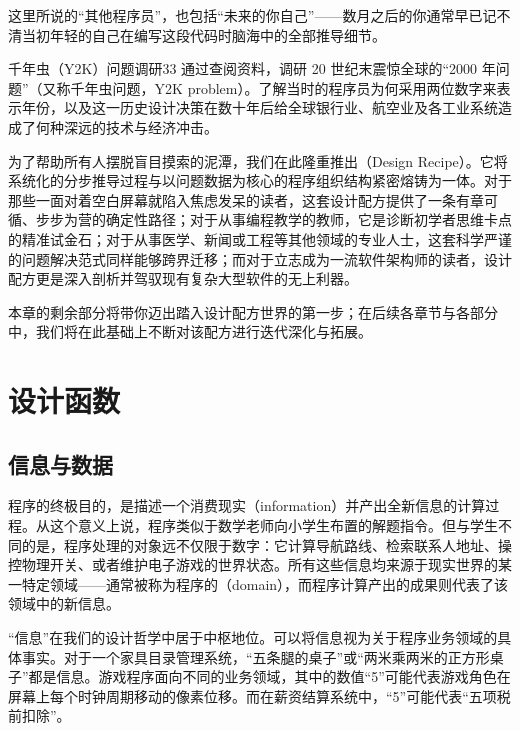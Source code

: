 \begin{notebox}[重读代码的现实]
这里所说的“其他程序员”，也包括“未来的你自己”——数月之后的你通常早已记不清当初年轻的自己在编写这段代码时脑海中的全部推导细节。
\end{notebox}

\begin{exercise}{千年虫（Y2K）问题调研}{33}
通过查阅资料，调研 20 世纪末震惊全球的“2000 年问题”（又称千年虫问题，Y2K problem）。了解当时的程序员为何采用两位数字来表示年份，以及这一历史设计决策在数十年后给全球银行业、航空业及各工业系统造成了何种深远的技术与经济冲击。
\end{exercise}

为了帮助所有人摆脱盲目摸索的泥潭，我们在此隆重推出（Design Recipe）。它将系统化的分步推导过程与以问题数据为核心的程序组织结构紧密熔铸为一体。对于那些一面对着空白屏幕就陷入焦虑发呆的读者，这套设计配方提供了一条有章可循、步步为营的确定性路径；对于从事编程教学的教师，它是诊断初学者思维卡点的精准试金石；对于从事医学、新闻或工程等其他领域的专业人士，这套科学严谨的问题解决范式同样能够跨界迁移；而对于立志成为一流软件架构师的读者，设计配方更是深入剖析并驾驭现有复杂大型软件的无上利器。

本章的剩余部分将带你迈出踏入设计配方世界的第一步；在后续各章节与各部分中，我们将在此基础上不断对该配方进行迭代深化与拓展。


\section{设计函数}
\label{sec:3.1}

\subsection{信息与数据}

程序的终极目的，是描述一个消费现实（information）并产出全新信息的计算过程。从这个意义上说，程序类似于数学老师向小学生布置的解题指令。但与学生不同的是，程序处理的对象远不仅限于数字：它计算导航路线、检索联系人地址、操控物理开关、或者维护电子游戏的世界状态。所有这些信息均来源于现实世界的某一特定领域——通常被称为程序的（domain），而程序计算产出的成果则代表了该领域中的新信息。

“信息”在我们的设计哲学中居于中枢地位。可以将信息视为关于程序业务领域的具体事实。对于一个家具目录管理系统，“五条腿的桌子”或“两米乘两米的正方形桌子”都是信息。游戏程序面向不同的业务领域，其中的数值“5”可能代表游戏角色在屏幕上每个时钟周期移动的像素位移。而在薪资结算系统中，“5”可能代表“五项税前扣除”。

